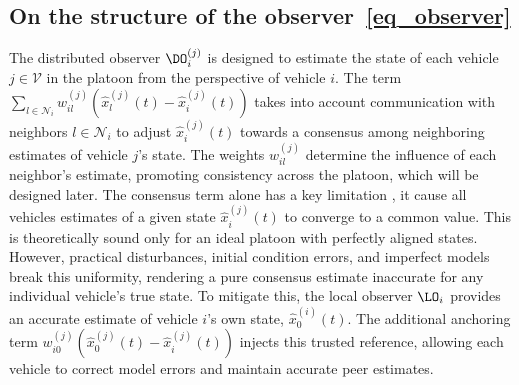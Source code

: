 \subsection{On the structure of the observer~\eqref{eq_observer}}
\vspace*{-0.3cm}
%
The distributed observer $\DO_i^{(j)}$ is designed to estimate the state of each vehicle $j \in \mathcal{V}$ in the platoon from the perspective of vehicle $i$. 
The term $\sum_{l \in {\mathcal{N}}_i} w_{il}^{(j)} \left( \hat{x}_l^{(j)}(t) - \hat{x}_i^{(j)}(t) \right)$ takes into account communication with neighbors $l \in {\mathcal{N}}_i$ to adjust $\hat{x}_i^{(j)}(t)$ towards a consensus among neighboring estimates of vehicle $j$'s state. The weights $w_{il}^{(j)}$ determine the influence of each neighbor's estimate, promoting consistency across the platoon, which will be designed later. The consensus term alone has a key limitation , it cause all vehicles estimates of a given state $\hat{x}_i^{(j)}(t)$ to converge to a common value. This is theoretically sound only for an ideal platoon with perfectly aligned states. However, practical disturbances, initial condition errors, and imperfect models break this uniformity, rendering a pure consensus estimate inaccurate for any individual vehicle's true state. To mitigate this, the local observer $\LO_i$ provides an accurate estimate of vehicle $i$'s own state, $\hat{x}_0^{(i)}(t)$. The additional anchoring term $w_{i0}^{(j)} \left( \hat{x}_0^{(j)}(t) - \hat{x}_i^{(j)}(t) \right)$ injects this trusted reference, allowing each vehicle to correct model errors and maintain accurate peer estimates.




